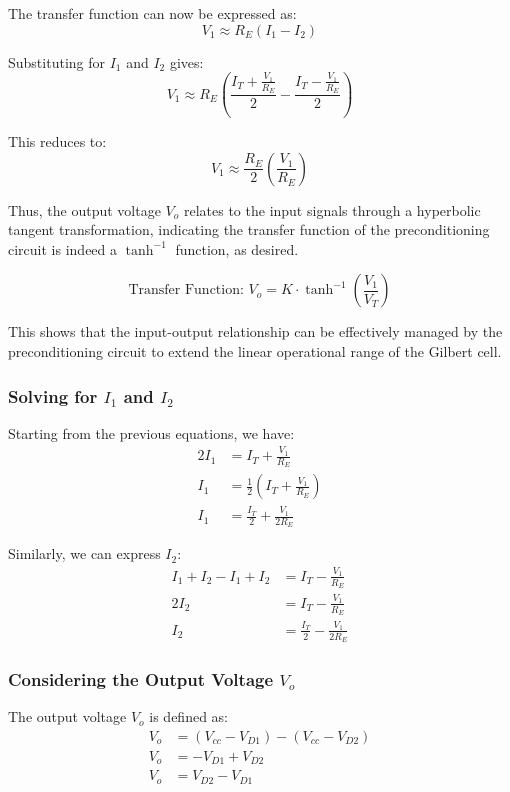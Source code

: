 \documentclass[a4paper,9pt,twoside,openany,twocolumn]{memoir}
\begin{document}
The transfer function can now be expressed as:
\[
V_1 \approx R_E \left(I_1 - I_2\right) \tag{11}
\]

Substituting for \( I_1 \) and \( I_2 \) gives:
\[
V_1 \approx R_E \left(\frac{I_T + \frac{V_1}{R_E}}{2} - \frac{I_T - \frac{V_1}{R_E}}{2}\right) \tag{12}
\]

This reduces to:
\[
V_1 \approx \frac{R_E}{2}\left(\frac{V_1}{R_E}\right) \tag{13}
\]

Thus, the output voltage \( V_o \) relates to the input signals through a hyperbolic tangent transformation, indicating the transfer function of the preconditioning circuit is indeed a \(\tanh^{-1}\) function, as desired.

\[
\text{Transfer Function: } V_o = K \cdot \tanh^{-1}\left(\frac{V_1}{V_T}\right) \tag{14}
\]

This shows that the input-output relationship can be effectively managed by the preconditioning circuit to extend the linear operational range of the Gilbert cell.

\subsubsection{Solving for \(I_1\) and \(I_2\)}

Starting from the previous equations, we have:
\begin{align*}
2I_1 &= I_T + \frac{V_1}{R_E} \tag{8} \\
I_1 &= \frac{1}{2}\left(I_T + \frac{V_1}{R_E}\right) \tag{9} \\
I_1 &= \frac{I_T}{2} + \frac{V_1}{2 R_E} \tag{10}
\end{align*}

Similarly, we can express \(I_2\):
\begin{align*}
I_1 + I_2 - I_1 + I_2 &= I_T - \frac{V_1}{R_E} \tag{11} \\
2I_2 &= I_T - \frac{V_1}{R_E} \tag{12} \\
I_2 &= \frac{I_T}{2} - \frac{V_1}{2R_E} \tag{13}
\end{align*}

\subsubsection{Considering the Output Voltage \(V_o\)}

The output voltage \(V_o\) is defined as:
\begin{align*}
V_o &= (V_{cc} - V_{D1}) - (V_{cc} - V_{D2}) \tag{14} \\
V_o &= -V_{D1} + V_{D2} \tag{15} \\
V_o &= V_{D2} - V_{D1} \tag{16}
\end{align*}
\end{document}
